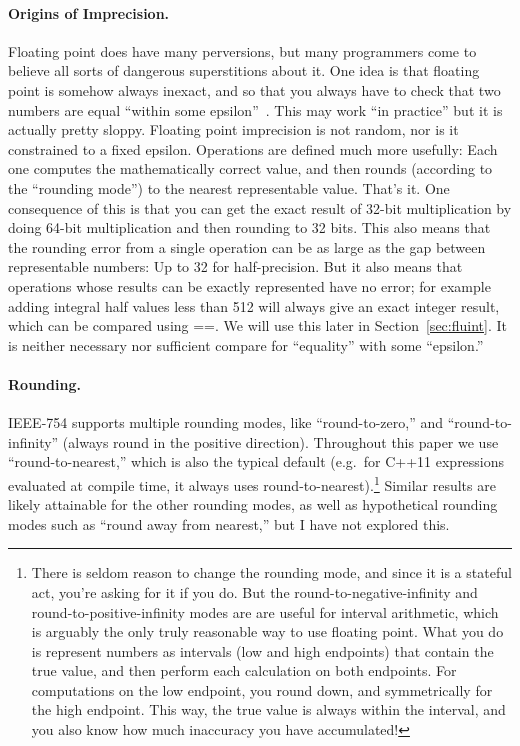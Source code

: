 \documentclass[twocolumn]{article}
\begin{document}
\paragraph{Origins of Imprecision.}
Floating point does have many perversions, but many programmers come
to believe all sorts of dangerous superstitions about it. One idea is
that floating point is somehow always inexact, and so that you always
have to check that two numbers are equal ``within some
epsilon''~\cite{murphy2014epsilon}. This may work ``in practice'' but
it is actually pretty sloppy. Floating point imprecision is not
random, nor is it constrained to a fixed epsilon. Operations are
defined much more usefully: Each one computes the mathematically
correct value, and then rounds (according to the ``rounding mode'') to
the nearest representable value. That's it. One consequence of this is
that you can get the exact result of 32-bit multiplication by doing
64-bit multiplication and then rounding to 32 bits. This also means
that the rounding error from a single operation can be as large as the
gap between representable numbers: Up to 32 for half-precision. But it
also means that operations whose results can be exactly represented
have no error; for example adding integral half values less than 512
will always give an exact integer result, which can be compared using
==. We will use this later in Section~\ref{sec:fluint}. It is
neither necessary nor sufficient compare for ``equality'' with some
``epsilon.''

\paragraph{Rounding.}
IEEE-754 supports multiple rounding modes, like ``round-to-zero,'' and
``round-to-infinity'' (always round in the positive direction).
Throughout this paper we use ``round-to-nearest,'' which is also the
typical default (e.g.~for C++11 expressions evaluated at compile time,
it always uses round-to-nearest).\footnote{There is seldom reason to
  change the rounding mode, and since it is a stateful act, you're
  asking for it if you do. But the round-to-negative-infinity and
  round-to-positive-infinity modes are are useful for interval
  arithmetic, which is arguably the only truly reasonable way to use
  floating point. What you do is represent numbers as intervals (low
  and high endpoints) that contain the true value, and then perform
  each calculation on both endpoints. For computations on the low
  endpoint, you round down, and symmetrically for the high endpoint.
  This way, the true value is always within the interval, and you also
  know how much inaccuracy you have accumulated!} Similar results are
likely attainable for the other rounding modes, as well as
hypothetical rounding modes such as ``round away from nearest,'' but I
have not explored this.
\end{document}
